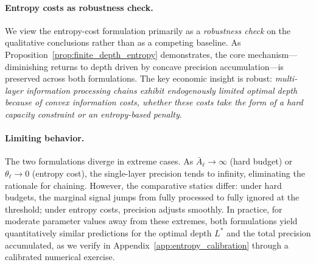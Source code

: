 \paragraph{Entropy costs as robustness check.} We view the entropy-cost formulation primarily as a \emph{robustness check} on the qualitative conclusions rather than as a competing baseline. As Proposition~\ref{prop:finite_depth_entropy} demonstrates, the core mechanism---diminishing returns to depth driven by concave precision accumulation---is preserved across both formulations. The key economic insight is robust: \emph{multi-layer information processing chains exhibit endogenously limited optimal depth because of convex information costs, whether these costs take the form of a hard capacity constraint or an entropy-based penalty}.

\paragraph{Limiting behavior.} The two formulations diverge in extreme cases. As $\bar{A}_\ell \to \infty$ (hard budget) or $\theta_\ell \to 0$ (entropy cost), the single-layer precision tends to infinity, eliminating the rationale for chaining. However, the comparative statics differ: under hard budgets, the marginal signal jumps from fully processed to fully ignored at the threshold; under entropy costs, precision adjusts smoothly. In practice, for moderate parameter values away from these extremes, both formulations yield quantitatively similar predictions for the optimal depth $L^{*}$ and the total precision accumulated, as we verify in Appendix~\ref{app:entropy_calibration} through a calibrated numerical exercise.
